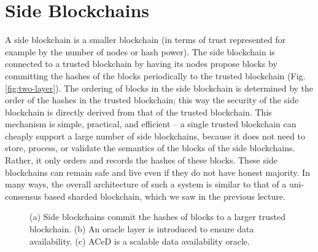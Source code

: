 \documentclass{article}
\begin{document}
\section*{Side Blockchains}
A side blockchain is a smaller blockchain (in terms of trust represented for example by  the number of nodes or hash power). The side blockchain is connected to a trusted blockchain by having its nodes propose blocks by committing the hashes of the blocks periodically to the trusted blockchain (Fig.\ref{fig:two-layer}). The ordering of blocks in the side blockchain is determined by the order of the hashes in the trusted blockchain; this way the security of the side blockchain is directly derived from that of the trusted blockchain. This mechanism is simple, practical, and efficient -- a single trusted blockchain can cheaply support a large number of side blockchains, because it does not need to store, process, or validate the semantics of the blocks of the side blockchains. Rather, it only orders and records the hashes of these blocks. These side blockchains can remain safe and live even if they do not have honest majority. In many ways, the overall architecture of such a system is similar to that of a uni-consensus based sharded blockchain, which we saw in the previous lecture.

\begin{figure}
\centering
{}
\usebox{\measurebox}
\begin{minipage}[b][\ht\measurebox]{.51\textwidth}
  \end{minipage}
\caption{(a) Side blockchains commit the hashes of blocks to a larger trusted blockchain. (b) An oracle layer is introduced to ensure data availability. (c) ACeD is a scalable data availability oracle.}
\end{figure}  
\end{document}
